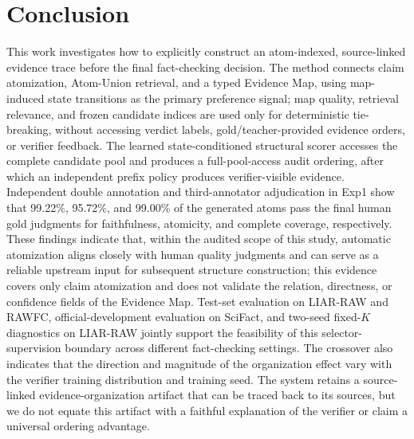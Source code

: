 \documentclass[letterpaper]{article}
\begin{document}
\section{Conclusion}

This work investigates how to explicitly construct an atom-indexed, source-linked evidence trace before the final fact-checking decision. The method connects claim atomization, Atom-Union retrieval, and a typed Evidence Map, using map-induced state transitions as the primary preference signal; map quality, retrieval relevance, and frozen candidate indices are used only for deterministic tie-breaking, without accessing verdict labels, gold/teacher-provided evidence orders, or verifier feedback. The learned state-conditioned structural scorer accesses the complete candidate pool and produces a full-pool-access audit ordering, after which an independent prefix policy produces verifier-visible evidence. Independent double annotation and third-annotator adjudication in Exp1 show that 99.22\%, 95.72\%, and 99.00\% of the generated atoms pass the final human gold judgments for faithfulness, atomicity, and complete coverage, respectively. These findings indicate that, within the audited scope of this study, automatic atomization aligns closely with human quality judgments and can serve as a reliable upstream input for subsequent structure construction; this evidence covers only claim atomization and does not validate the relation, directness, or confidence fields of the Evidence Map. Test-set evaluation on LIAR-RAW and RAWFC, official-development evaluation on SciFact, and two-seed fixed-$K$ diagnostics on LIAR-RAW jointly support the feasibility of this selector-supervision boundary across different fact-checking settings. The crossover also indicates that the direction and magnitude of the organization effect vary with the verifier training distribution and training seed. The system retains a source-linked evidence-organization artifact that can be traced back to its sources, but we do not equate this artifact with a faithful explanation of the verifier or claim a universal ordering advantage.


\end{document}
